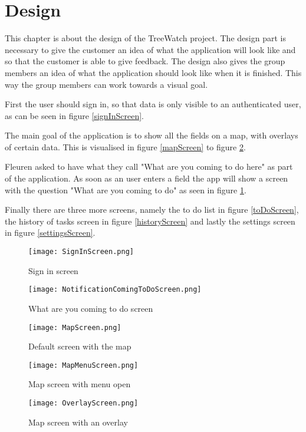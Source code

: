 \section{Design\label{sec:Design}}
This chapter is about the design of the TreeWatch project. The design part is necessary to give the customer an idea of what the application will look like and so that the customer is able to give feedback. The design also gives the group members an idea of what the application should look like when it is finished. This way the group members can work towards a visual goal.

First the user should sign in, so that data is only visible to an authenticated user, as can be seen in figure \ref{signInScreen}. 

The main goal of the application is to show all the fields on a map, with overlays of certain data. This is visualised in figure \ref{mapScreen} to figure \ref{overlayScreen}. 

Fleuren asked to have what they call "What are you coming to do here" as part of the application. As soon as an user enters a field the \gls{app} will show a screen with the question "What are you coming to do" as seen in figure \ref{comingToDoScreen}. 

Finally there are three more screens, namely the to do list in figure \ref{toDoScreen}, the history of tasks screen in figure \ref{historyScreen} and lastly the settings screen in figure \ref{settingsScreen}.

\begin{figure}[ht]
	\centering
	\texttt{[image: SignInScreen.png]}
	\caption{Sign in screen}\label{signInScreen}
	\endminipage\hfill
	\centering
	\texttt{[image: NotificationComingToDoScreen.png]}
	\caption{What are you coming to do screen}\label{comingToDoScreen}
	\endminipage\hfill
\end{figure}

\begin{figure}[ht]
	\centering
	\texttt{[image: MapScreen.png]}
	\caption{Default screen with the map}\label{mapScreen}
	\endminipage\hfill
	\centering
	\texttt{[image: MapMenuScreen.png]}
	\caption{Map screen with menu open}\label{mapMenuScreen}
	\endminipage\hfill
	\centering
	\texttt{[image: OverlayScreen.png]}
	\caption{Map screen with an overlay}\label{overlayScreen}
	\endminipage\hfill
\end{figure}

